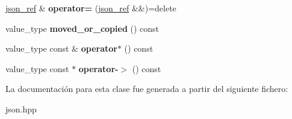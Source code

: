 \begin{DoxyCompactItemize}
\item 
\mbox{\label{classnlohmann_1_1detail_1_1json__ref_a9a73363d9be6b300ddd30745786c50a6}} 
\mbox{\hyperlink{classnlohmann_1_1detail_1_1json__ref}{json\+\_\+ref}} \& {\bfseries operator=} (\mbox{\hyperlink{classnlohmann_1_1detail_1_1json__ref}{json\+\_\+ref}} \&\&)=delete
\item 
\mbox{\label{classnlohmann_1_1detail_1_1json__ref_ae39e523218bf05cac3fb5b5b1cd5efb6}} 
value\+\_\+type {\bfseries moved\+\_\+or\+\_\+copied} () const
\item 
\mbox{\label{classnlohmann_1_1detail_1_1json__ref_aa3100e41472dba02ab78ccc1607e44ab}} 
value\+\_\+type const  \& {\bfseries operator$\ast$} () const
\item 
\mbox{\label{classnlohmann_1_1detail_1_1json__ref_adb652774a67829876449dc0b30637456}} 
value\+\_\+type const  $\ast$ {\bfseries operator-\/$>$} () const
\end{DoxyCompactItemize}


La documentación para esta clase fue generada a partir del siguiente fichero\+:\begin{DoxyCompactItemize}
\item 
json.\+hpp\end{DoxyCompactItemize}

